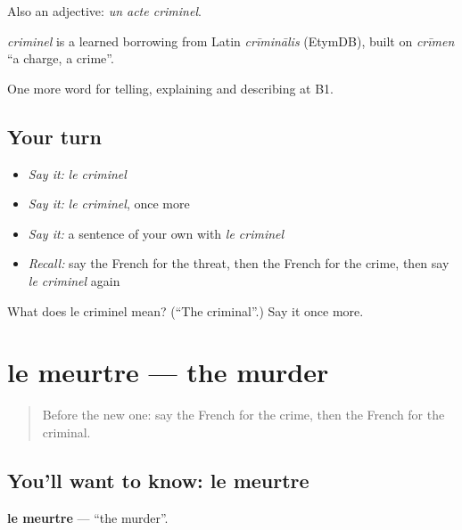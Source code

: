 Also an adjective: \emph{un acte criminel}.

\begin{cousinweb}
\emph{criminel} is a learned borrowing from Latin \emph{crīminālis} (EtymDB), built on \emph{crīmen} \textquotedblleft{}a charge, a crime\textquotedblright{}.
\end{cousinweb}

\begin{grammarlens}[title={What you've built}]
One more word for telling, explaining and describing at B1.
\end{grammarlens}

\subsection*{Your turn}
\begin{itemize}
\raggedright
  \item \emph{Say it:} \emph{le criminel}
  \item \emph{Say it:} \emph{le criminel}, once more
  \item \emph{Say it:} a sentence of your own with \emph{le criminel}
  \item \emph{Recall:} say the French for the threat, then the French for the crime, then say \emph{le criminel} again
\end{itemize}

\begin{tcolorbox}[breakable,colback=teal!4,colframe=teal!35!black,title={Before you move on}]
What does le criminel mean? (\textquotedblleft{}The criminal\textquotedblright{}.) Say it once more.
\end{tcolorbox}
\section[le meurtre]{le meurtre — the murder}

\label{lesson:FR-C290-meurtre}



\begin{quote}
Before the new one: say the French for the crime, then the French for the criminal.
\end{quote}

\subsection*{You'll want to know: le meurtre}
\textbf{le meurtre} — \textquotedblleft{}the murder\textquotedblright{}.

